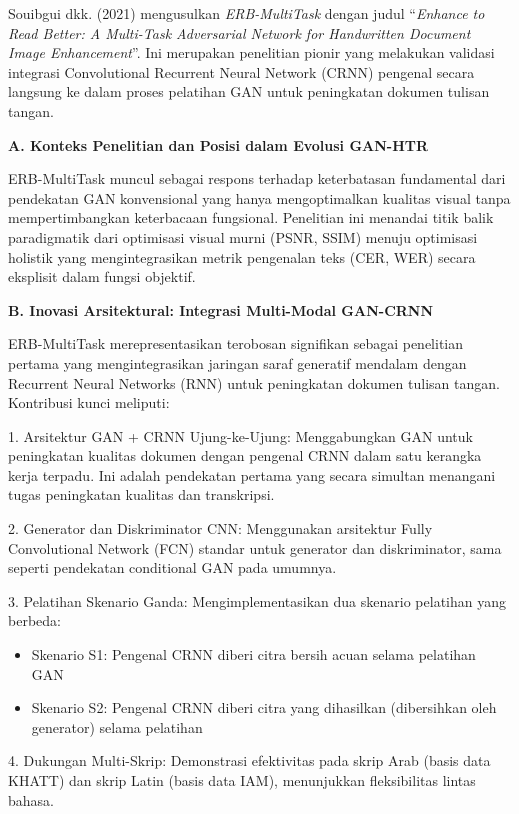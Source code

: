 \documentclass[12pt,a4paper]{book}
\begin{document}
Souibgui dkk. (2021) \cite{erb2021} mengusulkan \textit{ERB-MultiTask} dengan judul ``\textit{Enhance to Read Better: A Multi-Task Adversarial Network for Handwritten Document Image Enhancement}''. Ini merupakan penelitian pionir yang melakukan validasi integrasi Convolutional Recurrent Neural Network (CRNN) pengenal secara langsung ke dalam proses pelatihan GAN untuk peningkatan dokumen tulisan tangan.

\noindent\textbf{A. Konteks Penelitian dan Posisi dalam Evolusi GAN-HTR}

ERB-MultiTask muncul sebagai respons terhadap keterbatasan fundamental dari pendekatan GAN konvensional yang hanya mengoptimalkan kualitas visual tanpa mempertimbangkan keterbacaan fungsional. Penelitian ini menandai titik balik paradigmatik dari optimisasi visual murni (PSNR, SSIM) menuju optimisasi holistik yang mengintegrasikan metrik pengenalan teks (CER, WER) secara eksplisit dalam fungsi objektif.

\noindent\textbf{B. Inovasi Arsitektural: Integrasi Multi-Modal GAN-CRNN}

ERB-MultiTask merepresentasikan terobosan signifikan sebagai penelitian pertama yang mengintegrasikan jaringan saraf generatif mendalam dengan Recurrent Neural Networks (RNN) untuk peningkatan dokumen tulisan tangan. Kontribusi kunci meliputi:

1. Arsitektur GAN + CRNN Ujung-ke-Ujung: Menggabungkan GAN untuk peningkatan kualitas dokumen dengan pengenal CRNN dalam satu kerangka kerja terpadu. Ini adalah pendekatan pertama yang secara simultan menangani tugas peningkatan kualitas dan transkripsi.

2. Generator dan Diskriminator CNN: Menggunakan arsitektur Fully Convolutional Network (FCN) standar untuk generator dan diskriminator, sama seperti pendekatan conditional GAN pada umumnya.

3. Pelatihan Skenario Ganda: Mengimplementasikan dua skenario pelatihan yang berbeda:
\begin{itemize}
 \item Skenario S1: Pengenal CRNN diberi citra bersih acuan selama pelatihan GAN
 \item Skenario S2: Pengenal CRNN diberi citra yang dihasilkan (dibersihkan oleh generator) selama pelatihan
\end{itemize}

4. Dukungan Multi-Skrip: Demonstrasi efektivitas pada skrip Arab (basis data KHATT) dan skrip Latin (basis data IAM), menunjukkan fleksibilitas lintas bahasa.
\end{document}
